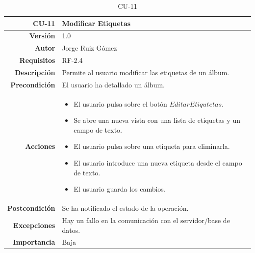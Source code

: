 \begin{table}[H]
    \centering
    \begin{tabular}{r|p{}}
    \hline
    \textbf{CU-11}  & \textbf{Modificar Etiquetas}                                 \\ \hline
    \textbf{Versión}       & 1.0                                                     \\
    \textbf{Autor}         & Jorge Ruiz Gómez                                        \\
    \textbf{Requisitos}    & RF-2.4                                        \\
    \textbf{Descripción}   & Permite al usuario modificar las etiquetas de un álbum. \\ \hline
    \textbf{Precondición}  & El usuario ha detallado un álbum.\\
    \textbf{Acciones}      &    \begin{itemize}
                                    \item El usuario pulsa sobre el botón $Editar Etiqutetas$.
                                    \item Se abre una nueva vista con una lista de etiquetas y un campo de texto.
                                    \item El usuario pulsa sobre una etiqueta para eliminarla.
                                    \item El usuario introduce una nueva etiqueta desde el campo de texto.
                                    \item El usuario guarda los cambios. 
                                \end{itemize}\\
                                                                              
    \textbf{Postcondición} & Se ha notificado el estado de la operación. \\
    \textbf{Excepciones}   & Hay un fallo en la comunicación con el servidor/base de datos.                                                 \\
    \textbf{Importancia}   & Baja                                                    \\ \hline
    \end{tabular}
    \caption{CU-11}
    \label{tab:CUT-11}
\end{table}


